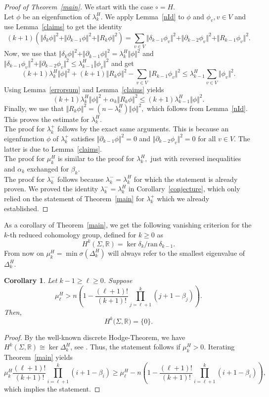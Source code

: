 \documentclass[10pt]{amsart}
\newtheorem{corollary}[theorem]{Corollary}
\theoremstyle{definition}
\begin{document}
\begin{proof}[Proof of Theorem~\ref{main}]
We start with the case $\circ = H.$\\
Let $\phi$ be an eigenfunction of $\lambda^H_k.$ We apply Lemma~\ref{nId} to $\phi$ and $\phi_v,v\in V$ and use Lemma~\ref{claims} to get the identity
\[(k+1)\left(\Vert\delta_k\phi\Vert^2+\Vert\partial_{k-1}\phi\Vert^2+\Vert R_k\phi\Vert^2\right) = \sum_{v\in V}\Vert\delta_{k-1}\phi_v\Vert^2+\Vert\partial_{k-2}\phi_v\Vert^2+\Vert R_{k-1}\phi_v\Vert^2.\]
Now, we use that $\Vert\delta_k\phi\Vert^2+\Vert\partial_{k-1}\phi\Vert^2 = \lambda^H_k\Vert\phi\Vert^2$ and $\Vert\delta_{k-1}\phi_v\Vert^2+\Vert\partial_{k-2}\phi_v\Vert^2\leq\lambda^H_{k-1}\Vert\phi_v\Vert^2$ and get
\[(k+1)\lambda^H_k\Vert\phi\Vert^2 +(k+1)\Vert R_k\phi\Vert^2-\sum_{v\in V}\Vert R_{k-1}\phi_v\Vert^2\leq\lambda^H_{k-1}\sum_{v\in V}\Vert\phi_v\Vert^2.\]
Using Lemma~\ref{errorsum} and Lemma~\ref{claims} yields
\[(k+1)\lambda^H_k\Vert\phi\Vert^2 +\alpha_k\Vert R_k\phi\Vert^2\leq(k+1)\lambda^H_{k-1}\Vert\phi\Vert^2.\]
Finally, we use that $\Vert R_k\phi\Vert^2 = (n-\lambda^H_k)\Vert\phi\Vert^2,$ which follows from Lemma~\ref{nId}. This proves the estimate for $\lambda^H_k.$\\
The proof for $\lambda^+_k$ follows by the exact same arguments. This is because an eigenfunction $\phi$ of $\lambda^+_k$ satisfies $\Vert\partial_{k-1}\phi\Vert^2 = 0$ and $\Vert\partial_{k-2}\phi_v\Vert^2 = 0$ for all $v\in V.$ The latter is due to Lemma~\ref{claims}.\\
The proof for $\mu^H_k$ is similar to the proof for $\lambda^H_k,$ just with reversed inequalities and $\alpha_k$ exchanged for $\beta_k.$\\
The proof for $\lambda^-_k$ follows because $\lambda^-_k = \lambda^H_k$ for which the statement is already proven. We proved the identity $\lambda^-_k = \lambda^H_k$ in Corollary~\ref{conjecture}, which only relied on the statement of Theorem~\ref{main} for $\lambda^+_k$ which we already established.
  \end{proof}



As a corollary of Theorem~\ref{main}, we get the following vanishing criterion for the $k$-th reduced cohomology group, defined for $k\ge 0$ as
\[H^k(\Sigma,\mathbb{R})=\ker \delta_k / \mathrm{ran}\, \delta_{k-1}.\]
From now on $\mu^H_k = \min\sigma(\Delta^H_k)$ will always refer to the smallest eigenvalue of $\Delta^H_k.$
\begin{corollary}\label{homology}
    Let  $k-1\geq\ell\geq 0$. Suppose     \[\mu^H_\ell> n\left(1-\frac{(\ell+1)!}{(k+1)!}\prod_{j = \ell+1}^{k}(j+1-\beta_j)\right).\]
    Then, \[H^k(\Sigma,\mathbb{R)} = \lbrace0\rbrace.\]
\end{corollary}
\begin{proof}
    By the well-known discrete Hodge-Theorem, we have $H^k(\Sigma,\mathbb{R})\cong\ker\Delta^H_k$, see  \cite{Eckmann1944}. Thus, the statement follows if $\mu^H_k>0.$ Iterating Theorem~\ref{main} yields \[\mu^H_k\frac{(\ell+1)!}{(k+1)!}\prod_{i=\ell+1}^{k}(i+1-\beta_i)\geq \mu_\ell^H-n\left(1-\frac{(\ell+1)!}{(k+1)!}\prod_{i = \ell+1}^k(i+1-\beta_i)\right),\]
    which implies the statement.\end{proof}
\end{document}
